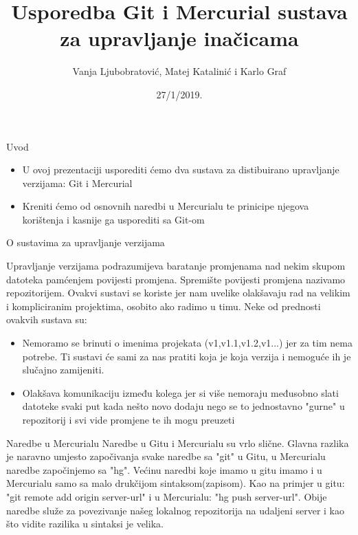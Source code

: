 \documentclass{beamer}
\title[Your Short Title]{Usporedba Git i Mercurial sustava za upravljanje inačicama}
\author{Vanja Ljubobratović, Matej Katalinić i Karlo Graf}
\institute{Tehnički Fakultet Rijeka}
\date{27/1/2019.}
\begin{document}
\begin{frame}
  \titlepage
\end{frame}


\begin{frame}{Uvod}

\begin{itemize}
  \item U ovoj prezentaciji usporediti ćemo dva sustava za distibuirano upravljanje verzijama: Git i Mercurial
  \item Kreniti ćemo od osnovnih naredbi u Mercurialu te prinicipe njegova korištenja i kasnije ga usporediti sa Git-om
\end{itemize}

\vskip 1cm


\end{frame}

\begin{frame}{O sustavima za upravljanje verzijama}

Upravljanje verzijama podrazumijeva baratanje promjenama nad nekim skupom datoteka pamćenjem povijesti promjena. Spremište povijesti promjena nazivamo repozitorijem. Ovakvi sustavi se koriste jer nam uvelike olakšavaju rad na velikim i kompliciranim projektima, osobito ako radimo u timu. Neke od prednosti ovakvih sustava su:
\begin{itemize}
  \item Nemoramo se brinuti o imenima projekata (v1,v1.1,v1.2,v1...) jer za tim nema potrebe. Ti sustavi će sami za nas pratiti koja je koja verzija i nemoguće ih je slučajno zamijeniti.
  \item Olakšava komunikaciju između kolega jer si više nemoraju međusobno slati datoteke svaki put kada nešto novo dodaju nego se to jednostavno "gurne" u repozitorij i svi vide promjene te ih mogu preuzeti
\end{itemize}
\end{frame}
\begin{frame}{Naredbe u Mercurialu}
Naredbe u Gitu i Mercurialu su vrlo slične. Glavna razlika je naravno umjesto započivanja svake naredbe sa "git" u Gitu, u Mercurialu naredbe započinjemo sa "hg". Većinu naredbi koje imamo u gitu imamo i u Mercurialu samo sa malo drukčijom sintaksom(zapisom). Kao na primjer u gitu: "git remote add origin server-url" i u Mercurialu: "hg push server-url". Obije naredbe služe za povezivanje našeg lokalnog repozitorija na udaljeni server i kao što vidite razilika u sintaksi je velika. 

\end{frame}
\end{document}
